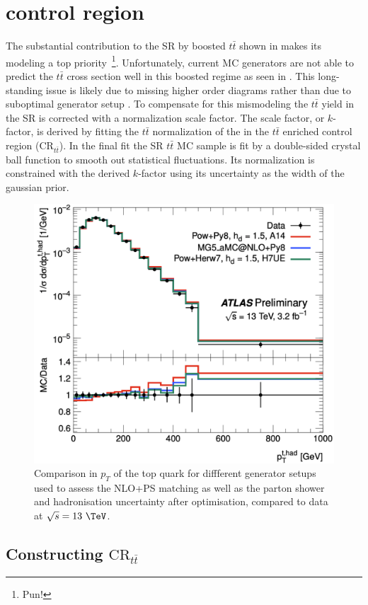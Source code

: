 \section{\ttbar control region} \label{sec:background:ttbar}

The substantial contribution to the SR by boosted $t\bar{t}$ shown in
 makes its modeling a top
priority~\footnote{Pun!}.  Unfortunately, current MC generators are not able to
predict the $t\bar{t}$ cross section well in this boosted regime as seen in
.  This long-standing issue is likely due to
missing higher order diagrams rather than due to suboptimal generator setup
\cite{ATL-PHYS-PUB-2018-009}.  To compensate for this mismodeling the
$t\bar{t}$ yield in the SR is corrected with a normalization scale factor.  The
scale factor, or $k$-factor, is derived by fitting the $t\bar{t}$ normalization
of the in the $t\bar{t}$ enriched control region ($\text{CR}_{t\bar{t}}$).  In
the final fit the SR $t\bar{t}$ MC sample is fit by a double-sided crystal ball
function \cite{Gaiser:1982yw} to smooth out statistical fluctuations.  Its
normalization is constrained with the derived $k$-factor using its uncertainty
as the width of the gaussian prior.

\begin{figure}[!htbp]
\centering
\includegraphics[width=0.6\linewidth]{figures/backgrounds/mismodeling}
\caption{Comparison in $p_{T}$ of the top quark for diffferent generator setups
used to assess the NLO+PS matching as well as the parton shower and
hadronisation uncertainty after optimisation, compared to data at $\sqrt{s} =
13~\TeV$.}
\label{sec:background:mismodeling}
\end{figure}

\subsection{Constructing $\text{CR}_{t\bar{t}}$}

